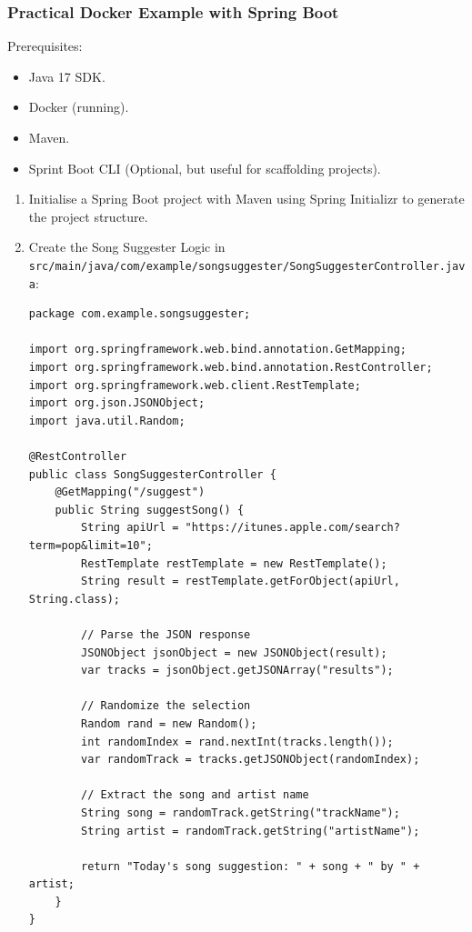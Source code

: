 \documentclass[a4paper,11pt]{article}
\begin{document}
\subsubsection{Practical Docker Example with Spring Boot}
Prerequisites:
\begin{itemize}
    \item   Java 17 SDK.
    \item   Docker (running).
    \item   Maven.
    \item   Sprint Boot CLI (Optional, but useful for scaffolding projects).
\end{itemize}

\begin{enumerate}
    \item   Initialise a Spring Boot project with Maven using Spring Initializr to generate the project structure.
    \item   Create the Song Suggester Logic in \verb|src/main/java/com/example/songsuggester/SongSuggesterController.java|:
            \begin{verbatim}
package com.example.songsuggester;

import org.springframework.web.bind.annotation.GetMapping;
import org.springframework.web.bind.annotation.RestController;
import org.springframework.web.client.RestTemplate;
import org.json.JSONObject;
import java.util.Random;

@RestController
public class SongSuggesterController {
    @GetMapping("/suggest")
    public String suggestSong() {
        String apiUrl = "https://itunes.apple.com/search?term=pop&limit=10";
        RestTemplate restTemplate = new RestTemplate();
        String result = restTemplate.getForObject(apiUrl, String.class);

        // Parse the JSON response
        JSONObject jsonObject = new JSONObject(result);
        var tracks = jsonObject.getJSONArray("results");

        // Randomize the selection
        Random rand = new Random();
        int randomIndex = rand.nextInt(tracks.length());
        var randomTrack = tracks.getJSONObject(randomIndex);

        // Extract the song and artist name
        String song = randomTrack.getString("trackName");
        String artist = randomTrack.getString("artistName");

        return "Today's song suggestion: " + song + " by " + artist;
    }
}
            \end{verbatim}


\end{enumerate}
\end{document}
